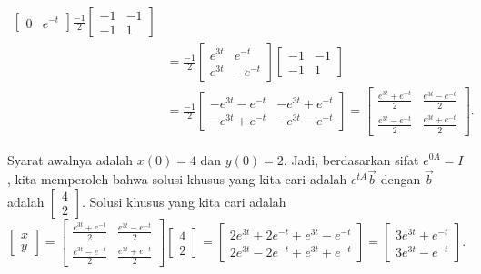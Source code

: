 \begin{example}
\begin{equation*}
\begin{split}
\begin{bmatrix}
0 & e^{-t}
\end{bmatrix}
\frac{-1}{2}
\begin{bmatrix}
-1 & -1 \\
-1 & 1
\end{bmatrix}
\\
& =
\frac{-1}{2}
\begin{bmatrix}
e^{3t} & e^{-t} \\
e^{3t} & -e^{-t}
\end{bmatrix}
\begin{bmatrix}
-1 & -1 \\
-1 & 1
\end{bmatrix}
\\
& =
\frac{-1}{2}
\begin{bmatrix}
-e^{3t}-e^{-t} & -e^{3t}+e^{-t} \\
-e^{3t}+e^{-t} & -e^{3t}-e^{-t}
\end{bmatrix}
 =
\begin{bmatrix}
\frac{e^{3t}+e^{-t}}{2} & \frac{e^{3t}-e^{-t}}{2} \\
\frac{e^{3t}-e^{-t}}{2} & \frac{e^{3t}+e^{-t}}{2}
\end{bmatrix} .
\end{split}
\end{equation*}

Syarat awalnya adalah $x(0) = 4$ dan $y(0) = 2$.  Jadi, berdasarkan sifat
$e^{0A} = I$, kita memperoleh bahwa solusi khusus yang kita cari
adalah $e^{tA} \vec{b}$ dengan $\vec{b}$ adalah $\left[
\begin{smallmatrix} 4 \\ 2 \end{smallmatrix} \right]$.
Solusi khusus yang kita cari adalah
\begin{equation*}
\begin{bmatrix}
x \\ y
\end{bmatrix}
=
\begin{bmatrix}
\frac{e^{3t}+e^{-t}}{2} & \frac{e^{3t}-e^{-t}}{2} \\
\frac{e^{3t}-e^{-t}}{2} & \frac{e^{3t}+e^{-t}}{2}
\end{bmatrix}
\begin{bmatrix}
4 \\ 2
\end{bmatrix}
=
\begin{bmatrix}
2e^{3t}+2e^{-t} + e^{3t}-e^{-t} \\
2e^{3t}-2e^{-t} + e^{3t}+e^{-t}
\end{bmatrix}
=
\begin{bmatrix}
3e^{3t}+e^{-t} \\
3e^{3t}-e^{-t}
\end{bmatrix} .
\end{equation*}
\end{example}

